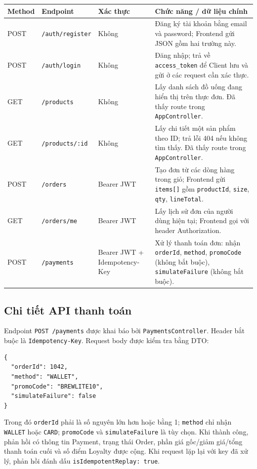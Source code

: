 \begin{center}
\renewcommand{\arraystretch}{1.18}
\begin{tabular}{|p{1.8cm}|p{3.2cm}|p{2.3cm}|p{6.2cm}|}
\hline
\textbf{Method} & \textbf{Endpoint} & \textbf{Xác thực} & \textbf{Chức năng / dữ liệu chính} \\
\hline
POST & \texttt{/auth/register} & Không & Đăng ký tài khoản bằng email và password; Frontend gửi JSON gồm hai trường này. \\
\hline
POST & \texttt{/auth/login} & Không & Đăng nhập; trả về \texttt{access\_token} để Client lưu và gửi ở các request cần xác thực. \\
\hline
GET & \texttt{/products} & Không & Lấy danh sách đồ uống đang hiển thị trên thực đơn. Đã thấy route trong \texttt{AppController}. \\
\hline
GET & \texttt{/products/:id} & Không & Lấy chi tiết một sản phẩm theo ID; trả lỗi 404 nếu không tìm thấy. Đã thấy route trong \texttt{AppController}. \\
\hline
POST & \texttt{/orders} & Bearer JWT & Tạo đơn từ các dòng hàng trong giỏ; Frontend gửi \texttt{items[]} gồm \texttt{productId}, \texttt{size}, \texttt{qty}, \texttt{lineTotal}. \\
\hline
GET & \texttt{/orders/me} & Bearer JWT & Lấy lịch sử đơn của người dùng hiện tại; Frontend gọi với header Authorization. \\
\hline
POST & \texttt{/payments} & Bearer JWT + Idempotency-Key & Xử lý thanh toán đơn: nhận \texttt{orderId}, \texttt{method}, \texttt{promoCode} (không bắt buộc), \texttt{simulateFailure} (không bắt buộc). \\
\hline
\end{tabular}
\end{center}

\subsection{Chi tiết API thanh toán}

Endpoint \texttt{POST /payments} được khai báo bởi \texttt{PaymentsController}. Header bắt buộc là \texttt{Idempotency-Key}. Request body được kiểm tra bằng DTO:
\begin{verbatim}
{
  "orderId": 1042,
  "method": "WALLET",
  "promoCode": "BREWLITE10",
  "simulateFailure": false
}
\end{verbatim}

Trong đó \texttt{orderId} phải là số nguyên lớn hơn hoặc bằng 1; \texttt{method} chỉ nhận \texttt{WALLET} hoặc \texttt{CARD}; \texttt{promoCode} và \texttt{simulateFailure} là tùy chọn. Khi thành công, phản hồi có thông tin Payment, trạng thái Order, phần giá gốc/giảm giá/tổng thanh toán cuối và số điểm Loyalty được cộng. Khi request lặp lại với key đã xử lý, phản hồi đánh dấu \texttt{isIdempotentReplay: true}.

